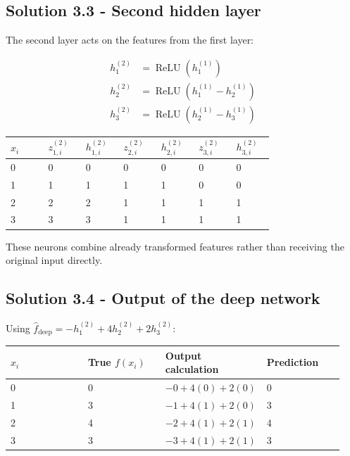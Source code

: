 \documentclass{course_sheet}
\begin{document}
\subsection{Solution 3.3 - Second hidden layer}

The second layer acts on the features from the first layer:

\begin{equation*}
\begin{split}
h^{(2)}_1&=\operatorname{ReLU}(h^{(1)}_1)\\
h^{(2)}_2&=\operatorname{ReLU}(h^{(1)}_1-h^{(1)}_2)\\
h^{(2)}_3&=\operatorname{ReLU}(h^{(1)}_2-h^{(1)}_3)
\end{split}
\end{equation*}

\begin{center}

\begingroup
\setlength{\tabcolsep}{3pt}
\small
\begin{tabular}{@{}p{0.128\linewidth}p{0.128\linewidth}p{0.128\linewidth}p{0.128\linewidth}p{0.128\linewidth}p{0.128\linewidth}p{0.128\linewidth}@{}}
\toprule
$x_i$ & $z^{(2)}_{1,i}$ & $h^{(2)}_{1,i}$ & $z^{(2)}_{2,i}$ & $h^{(2)}_{2,i}$ & $z^{(2)}_{3,i}$ & $h^{(2)}_{3,i}$ \\
\midrule
0 & 0 & 0 & 0 & 0 & 0 & 0 \\
1 & 1 & 1 & 1 & 1 & 0 & 0 \\
2 & 2 & 2 & 1 & 1 & 1 & 1 \\
3 & 3 & 3 & 1 & 1 & 1 & 1 \\
\bottomrule
\end{tabular}
\endgroup

\end{center}

These neurons combine already transformed features rather than receiving
the original input directly.

\subsection{Solution 3.4 - Output of the deep network}

Using $\hat f_{\mathrm{deep}}=-h^{(2)}_1+4h^{(2)}_2+2h^{(2)}_3$:

\begin{center}

\begingroup
\setlength{\tabcolsep}{3pt}
\begin{tabular}{@{}p{0.234\linewidth}p{0.234\linewidth}p{0.234\linewidth}p{0.234\linewidth}@{}}
\toprule
$x_i$ & True $f(x_i)$ & Output calculation & Prediction \\
\midrule
0 & 0 & $-0+4(0)+2(0)$ & 0 \\
1 & 3 & $-1+4(1)+2(0)$ & 3 \\
2 & 4 & $-2+4(1)+2(1)$ & 4 \\
3 & 3 & $-3+4(1)+2(1)$ & 3 \\
\bottomrule
\end{tabular}
\endgroup

\end{center}
\end{document}
